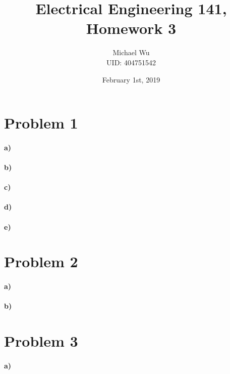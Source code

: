 \documentclass[12pt]{article}
\begin{document}
\title{Electrical Engineering 141, Homework 3}
\date{February 1st, 2019}
\author{Michael Wu\\UID: 404751542}
\maketitle

\section*{Problem 1}

\paragraph{a)}

\paragraph{b)}

\paragraph{c)}

\paragraph{d)}

\paragraph{e)}

\section*{Problem 2}

\paragraph{a)}

\paragraph{b)}

\section*{Problem 3}

\paragraph{a)}
\end{document}
